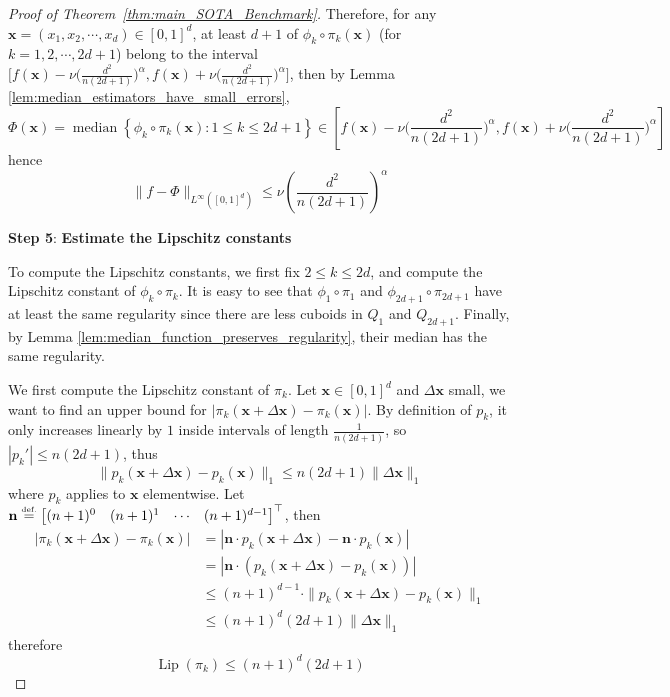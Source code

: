 \documentclass{article}
\numberwithin{equation}{section}
\theoremstyle{definition}
\newcommand{\eqdef}{\ensuremath{\stackrel{\mbox{\upshape\tiny def.}}{=}}}
\begin{document}
\begin{proof}[{Proof of Theorem~\ref{thm:main_SOTA_Benchmark}}]
Therefore, for any $\mathbf{x}=(x_1,x_2,\cdots,x_d)\in[0,1]^d$, at least $d+1$ of $\phi_k\circ\pi_k(\mathbf{x})$ (for $k=1,2,\cdots,2d+1$) belong to the interval $\Big[
f(\mathbf{x}) - \nu \big( \frac{d^2}{n(2d+1)} \big)^{\alpha} ,
f(\mathbf{x}) + \nu \big( \frac{d^2}{n(2d+1)} \big)^{\alpha} 
\Big]$, then by Lemma \ref{lem:median_estimators_have_small_errors}, 
\[
    \Phi(\mathbf{x})
    =
    \operatorname{median}\left\{
        \phi_k\circ\pi_k(\mathbf{x}): 1\le k\le 2d+1
    \right\}
    \in
    \left[
        f(\mathbf{x}) 
        - 
        \nu \Big( \frac{d^2}{n(2d+1)} \Big)^{\alpha}
        ,
        f(\mathbf{x}) 
        + 
        \nu \Big( \frac{d^2}{n(2d+1)} \Big)^{\alpha}
    \right]
\]
hence
$$\|f-\Phi\|_{L^{\infty}([0,1]^d)} \le \nu \left( 
\frac{d^2}{n(2d+1)}
\right)^{\alpha}$$

\textbf{Step 5}: \textbf{
Estimate the Lipschitz constants
}

To compute the Lipschitz constants, we first fix $2\le k\le 2d$, and compute the Lipschitz constant of $\phi_k\circ\pi_k$. It is easy to see that $\phi_1\circ\pi_1$ and $\phi_{2d+1}\circ\pi_{2d+1}$ have at least the same regularity since there are less cuboids in $Q_1$ and $Q_{2d+1}$. Finally, by Lemma \ref{lem:median_function_preserves_regularity}, their median has the same regularity. 

We first compute the Lipschitz constant of $\pi_k$. Let $\mathbf{x}\in[0,1]^d$ and $\Delta\mathbf{x}$ small, we want to find an upper bound for $|\pi_k(\mathbf{x}+\Delta\mathbf{x})-\pi_k(\mathbf{x})|$. By definition of $p_k$, it only increases linearly by $1$ inside intervals of length $\frac{1}{n(2d+1)}$, so $|p_k'|\le n(2d+1)$, thus 
$$\|p_k(\mathbf{x}+\Delta\mathbf{x})-p_k(\mathbf{x})\|_1 \le n(2d+1) \|\Delta\mathbf{x}\|_1$$
where $p_k$ applies to $\mathbf{x}$ elementwise. Let $\mathbf{n} \eqdef \begin{bmatrix} (n+1)^0 & (n+1)^1 & \cdots & (n+1)^{d-1} \end{bmatrix}^{\top}$, then
\begin{align*}
    |\pi_k(\mathbf{x}+\Delta\mathbf{x})-\pi_k(\mathbf{x})| 
    &= 
    |\mathbf{n}\cdot p_k(\mathbf{x}+\Delta\mathbf{x})-\mathbf{n}\cdot p_k(\mathbf{x})| \\
    &=
    |\mathbf{n}\cdot (p_k(\mathbf{x}+\Delta\mathbf{x})-p_k(\mathbf{x}))| \\
    &\le
    (n+1)^{d-1} \cdot \|p_k(\mathbf{x}+\Delta\mathbf{x})-p_k(\mathbf{x})\|_1 \\
    &\le
    (n+1)^{d}(2d+1) \|\Delta\mathbf{x}\|_1
\end{align*}
therefore
$$\operatorname{Lip}(\pi_k) 
\le (n+1)^d(2d+1)$$


\end{proof}
\end{document}
